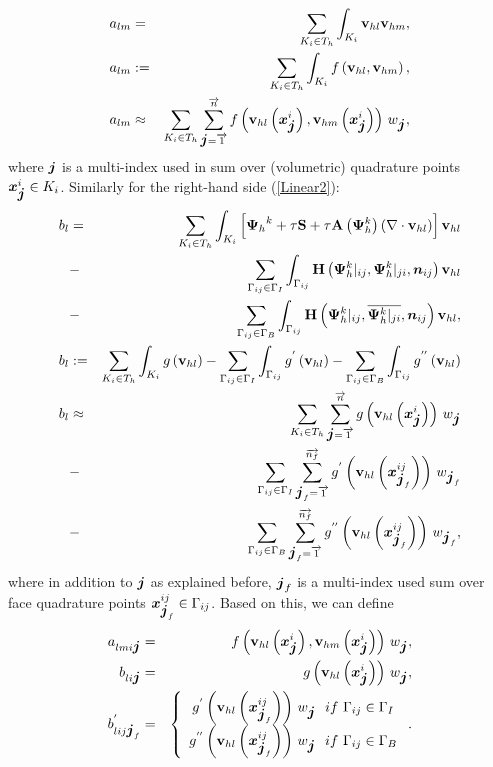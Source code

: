 \begin{eqnarray}
a_{lm} & = & \sum_{K_i \in T_h}\int_{K_i} \mathrm{\mathbf{v}}_{hl} \mathrm{\mathbf{v}}_{hm}, \\
a_{lm} & := & \sum_{K_i \in T_h}\int_{K_i} f\left(\mathrm{\mathbf{v}}_{hl}, \mathrm{\mathbf{v}}_{hm}\right) , \\
a_{lm} & \approx & \sum_{K_i \in T_h} \sum_{\mbox{\boldmath $j$}=\overrightarrow{1}}^{\overrightarrow{n}} f\left(\mathrm{\mathbf{v}}_{hl}\left(\mbox{\boldmath $x$}_{\mbox{\boldmath $j$}}^i\right), \mathrm{\mathbf{v}}_{hm}\left(\mbox{\boldmath $x$}_{\mbox{\boldmath $j$}}^i\right)\right)\,w_{\mbox{\boldmath $j$}},\label{Final_Integration_Fn}
\end{eqnarray}
where $\mbox{\boldmath $j$}$ is a multi-index used in sum over (volumetric) quadrature points $\mbox{\boldmath $x$}_{\mbox{\boldmath $j$}}^i \in K_i$.
Similarly for the right-hand side (\ref{Linear2}):
\begin{eqnarray}
b_{l} & = & \sum_{K_i \in T_h}\int_{K_i} \left[{\mathrm{\mathbf{\Psi}}_h}^{k} + \tau\mathrm{\mathbf{S}} + \tau\mathrm{\mathbf{A}}\left({\mathrm{\mathbf{\Psi}}_h^{k}}\right) \left(\nabla \cdot \mathrm{\mathbf{v}}_{hl}\right)\right] \mathrm{\mathbf{v}}_{hl}\\\nonumber & - &\sum_{\Gamma_{ij}\in\Gamma_I} \int_{\Gamma_{ij}}\mathrm{\mathbf{H}}\left({\mathrm{\mathbf{\Psi}}_h^{k}}|_{ij}, {\mathrm{\mathbf{\Psi}}_h^{k}}|_{ji}, \mbox{\boldmath $n$}_{ij}\right) \mathrm{\mathbf{v}}_{hl}\\\nonumber& - &\sum_{\Gamma_{ij}\in\Gamma_B} \int_{\Gamma_{ij}} \mathrm{\mathbf{H}}\left({\mathrm{\mathbf{\Psi}}_h^{k}}|_{ij}, \overline{{\mathrm{\mathbf{\Psi}}_h^{k}}|_{ji}}, \mbox{\boldmath $n$}_{ij}\right) \mathrm{\mathbf{v}}_{hl},\\
b_{l} & := & \sum_{K_i \in T_h}\int_{K_i} g\left(\mathrm{\mathbf{v}}_{hl}\right) - \sum_{\Gamma_{ij}\in\Gamma_I} \int_{\Gamma_{ij}}g^{'}\left(\mathrm{\mathbf{v}}_{hl}\right) - \sum_{\Gamma_{ij}\in\Gamma_B} \int_{\Gamma_{ij}} g^{''}\left(\mathrm{\mathbf{v}}_{hl}\right) \\
b_{l} & \approx & \sum_{K_i \in T_h} \sum_{\mbox{\boldmath $j$}=\overrightarrow{1}}^{\overrightarrow{n}} g\left(\mathrm{\mathbf{v}}_{hl}\left(\mbox{\boldmath $x$}_{\mbox{\boldmath $j$}}^i\right)\right)\,w_{\mbox{\boldmath $j$}}\\\nonumber & - & \sum_{\Gamma_{ij}\in\Gamma_I} \sum_{\mbox{\boldmath $j$}_f=\overrightarrow{1}}^{\overrightarrow{n_f}} g^{'}\left(\mathrm{\mathbf{v}}_{hl}\left(\mbox{\boldmath $x$}^{ij}_{\mbox{\boldmath $j$}_{f}}\right)\right)\,w_{\mbox{\boldmath $j$}_{f}}\\\nonumber & - & \sum_{\Gamma_{ij}\in\Gamma_B} \sum_{\mbox{\boldmath $j$}_{f}=\overrightarrow{1}}^{\overrightarrow{n_f}} g^{''}\left(\mathrm{\mathbf{v}}_{hl}\left(\mbox{\boldmath $x$}^{ij}_{\mbox{\boldmath $j$}_{f}}\right)\right)\,w_{\mbox{\boldmath $j$}_{f}},
\label{Final_Integration_Fn_b}
\end{eqnarray}
where in addition to $\mbox{\boldmath $j$}$ as explained before, $\mbox{\boldmath $j$}_{f}$ is a multi-index used sum over face quadrature points $\mbox{\boldmath $x$}_{\mbox{\boldmath $j$}_f}^{ij} \in \Gamma_{ij}$. Based on this, we can define
\begin{eqnarray}
\label{singleNumIntA}
a_{lmi \bfj} & = & f\lo\mrvhl\lo\bfx^i_{\bfj}\ro, \mrvhm\lo\bfx^i_{\bfj}\ro\ro\,w_{\bfj},\\
\label{singleNumIntB}
b_{li \bfj} & = & g\lo\mrvhl\lo\bfx^i_{\bfj}\ro\ro\,w_{\bfj},\\
\label{singleNumIntBface}
b^{'}_{lij \bfj_f} & = & \left\{\begin{array}{c} g^{'}\lo\mrvhl\lo\bfx^{ij}_{\bfj_f}\ro\ro\,w_{\bfj}\ \ if\ \Gamma_{ij}\in \Gamma_I \\ g^{''}\lo\mrvhl\lo\bfx^{ij}_{\bfj_f}\ro\ro\,w_{\bfj}\ \ if\ \Gamma_{ij}\in \Gamma_B \end{array}\right. .
\end{eqnarray}


